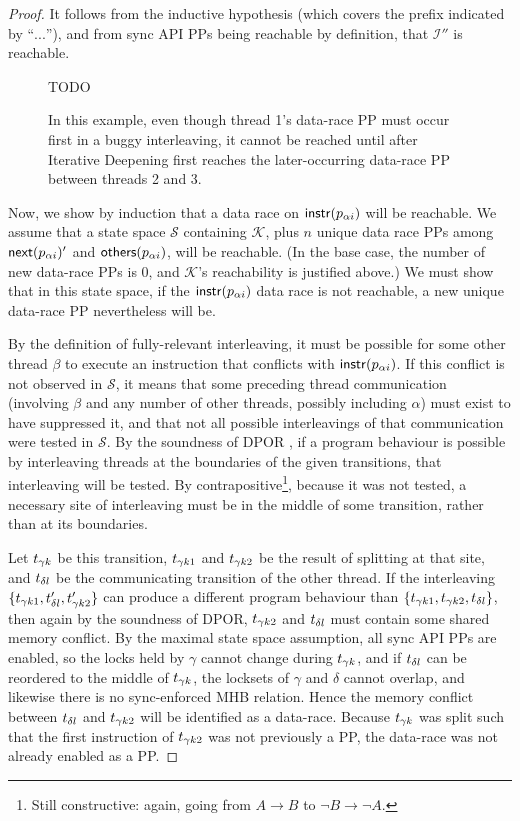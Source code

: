 \begin{proof}
It follows from the inductive hypothesis (which covers the prefix indicated by ``$...$''),
and from sync API PPs being reachable by definition,
that $\mathcal{I''}$ is reachable.

\begin{figure}[t]
	TODO %
	\caption{In this example, even though thread 1's data-race PP must occur first in a buggy interleaving, it cannot be reached until after Iterative Deepening first reaches the later-occurring data-race PP between threads 2 and 3.}
	\label{fig:threethreads}
\end{figure}

Now, we show by induction that a data race on $\mathsf{instr}(p_{\alpha{}i})$ will be reachable.
We assume that a state space $\mathcal{S}$ containing $\mathcal{K}$,
plus $n$ unique data race PPs among $\mathsf{next}(p_{\alpha{}i})'$ and $\mathsf{others}(p_{\alpha{}i})$,
will be reachable.
(In the base case, the number of new data-race PPs is 0, and $\mathcal{K}$'s reachability is justified above.)
We must show that in this state space, if the $\mathsf{instr}(p_{\alpha{}i})$ data race is not reachable,
a new unique data-race PP nevertheless will be.

By the definition of fully-relevant interleaving, it must be possible for some other thread $\beta$ to execute an instruction that conflicts with $\mathsf{instr}(p_{\alpha{}i})$.
%
If this conflict is not observed in $\mathcal{S}$,
it means that some preceding thread communication (involving $\beta$ and any number of other threads, possibly including $\alpha$)
must exist to have suppressed it,
and that not all possible interleavings of that communication were tested in $\mathcal{S}$.
%
By the soundness of DPOR \cite{dpor}, if a program behaviour is possible by interleaving threads at the boundaries of
the given transitions, that interleaving will be tested.
By contrapositive\footnote{
Still constructive: again, going from $A \rightarrow B$ to $\neg B \rightarrow \neg A$.},
because it was not tested, a necessary site of interleaving must be in the middle of some transition, rather than at its boundaries.

Let $t_{\gamma{}k}$ be this transition, $t_{\gamma{}k1}$ and $t_{\gamma{}k2}$ be the result of splitting at that site, and $t_{\delta{}l}$ be the communicating transition of the other thread.
%
If the interleaving $\{t_{\gamma{}k1}, t_{\delta{}l}', t_{\gamma{}k2}'\}$ can produce a different program behaviour than $\{t_{\gamma{}k1}, t_{\gamma{}k2}, t_{\delta{}l}\}$,
then again by the soundness of DPOR, $t_{\gamma{}k2}$ and $t_{\delta{}l}$ must contain some shared memory conflict.
By the maximal state space assumption, all sync API PPs are enabled, so the locks held by $\gamma$ cannot change during $t_{\gamma{}k}$,
and if $t_{\delta{}l}$ can be reordered to the middle of $t_{\gamma{}k}$, the locksets of $\gamma$ and $\delta$ cannot overlap,
and likewise there is no sync-enforced MHB relation.
Hence the memory conflict between $t_{\delta{}l}$ and $t_{\gamma{}k2}$ will be identified as a data-race.
Because $t_{\gamma{}k}$ was split such that the first instruction of $t_{\gamma{}k2}$ was not previously a PP, the data-race was not already enabled as a PP.


\end{proof}
